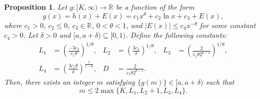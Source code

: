 \documentclass[10pt,a4paper]{amsart}
\newtheorem{prop}{Proposition}
\newcommand{\R}{\mathbb{R}}
\begin{document}
\begin{prop}
\label{prop:framework}
Let $g: [K, \infty) \rightarrow \R$ be a function of the form 
\begin{equation*}
g(x) = h(x) + E(x) = c_{1}x^{\theta}+ c_{2}\ln x+c_{3}+E(x),
\end{equation*}
where $c_{1} > 0$, $c_{2} \leq 0$, $c_{3}\in \R$, $0<\theta<1$, and $|E(x)| \leq c_{4}x^{-\theta}$ for some constant $c_{4}>0$. Let $\delta > 0$ and $[a, a+\delta) \subseteq [0,1)$. Define the following constants:
\begin{align*}
L_1 &= \left(\frac{-3c_{2}}{c_{1}\theta}\right)^{1/\theta}, & L_2 &= \left(\frac{3 c_{4}}{\delta}\right)^{1/\theta}, & L_3 &= \left(\frac{2}{c_1 \theta 2^{\theta-1}}\right)^{1/\theta}, \\
L_4 &= \left(\frac{3 c_{1} \theta}{\delta} \right)^{\frac{1}{1-\theta}}, & D &= \frac{2}{c_{1}\theta 2^{\theta-1}}. & &
\end{align*}
Then, there exists an integer $m$ satisfying $\{g(m)\} \in [a,a+\delta)$ such that
\begin{equation*}
m \leq 2\max\{K, L_{1}, L_{2}+1, L_{3}, L_{4}\}.
\end{equation*}
\end{prop}
\end{document}
